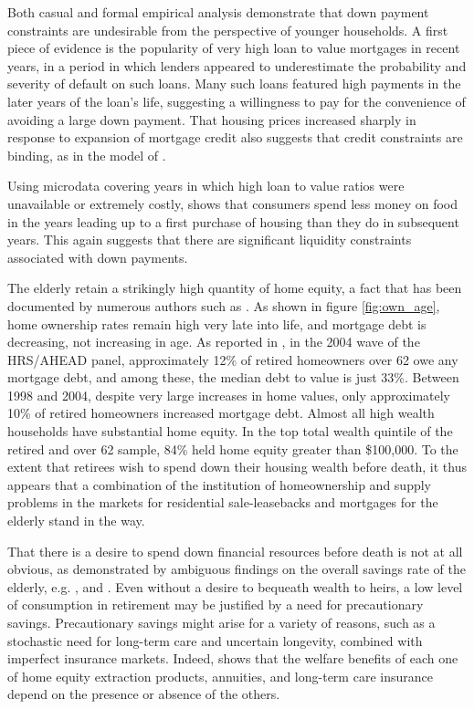 \documentclass[12pt]{article}
\begin{document}
Both casual and formal empirical analysis demonstrate that down payment
constraints are undesirable from the perspective of younger households.  A first
piece of evidence is the popularity of very high loan to value mortgages in
recent years, in a period in which lenders appeared to underestimate the
probability and severity of default on such loans.  Many such loans featured
high payments in the later years of the loan's life, suggesting a willingness to
pay for the convenience of avoiding a large down payment.  That housing prices
increased sharply in response to expansion of mortgage credit also suggests that
credit constraints are binding, as in the model of \citet{OrtaloMagneRady}.  

Using microdata covering years in which high loan to value ratios were
unavailable or extremely costly, \citet{Engelhardt96} shows that consumers spend
less money on food in the years leading up to a first purchase of housing than
they do in subsequent years.  This again suggests that there are significant
liquidity constraints associated with down payments.

The elderly retain a strikingly high quantity of home equity, a fact that has
been documented by numerous authors such as \citet{VentiWise}.  As shown in
figure \ref{fig:own_age}, home ownership rates remain high very late into life,
and mortgage debt is decreasing, not increasing in age.  As reported in
\citet{Davidoffltc}, in the 2004 wave of the HRS/AHEAD panel, approximately 12\%
of retired homeowners over 62 owe any mortgage debt, and among these, the median
debt to value is just 33\%.  Between 1998 and 2004, despite very large increases
in home values, only approximately 10\% of retired homeowners increased mortgage
debt.  Almost all high wealth households have substantial home equity.  In the
top total wealth quintile of the retired and over 62 sample, 84\% held home
equity greater than \$100,000.  To the extent that retirees wish to spend down
their housing wealth before death, it thus appears that a combination of the
institution of homeownership and supply problems in the markets for residential
sale-leasebacks and mortgages for the elderly stand in the way.

That there is a desire to spend down financial resources before death is not at
all obvious, as demonstrated by ambiguous findings on the overall savings rate
of the elderly, e.g.  \citet{Hurd90}, \citet{Horioka} and \citet{Weil}.  Even
without a desire to bequeath wealth to heirs, a low level of consumption in
retirement may be justified by a need for precautionary savings.  Precautionary
savings might arise for a variety of reasons, such as a stochastic need for
long-term care and uncertain longevity, combined with imperfect insurance
markets.  Indeed, \citet{Davidoffpuzzle} shows that the welfare benefits of
each one of home equity extraction products, annuities, and long-term care
insurance depend on the presence or absence of the others.  
\end{document}
